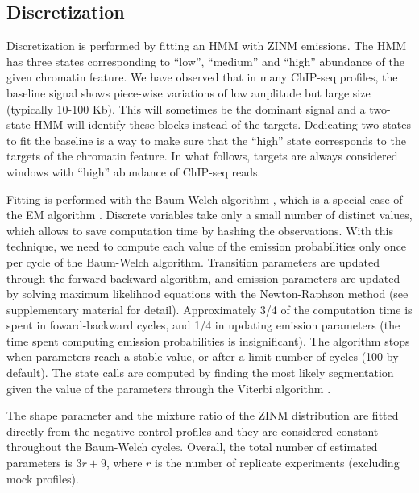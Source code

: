 \documentclass{bioinfo}
\begin{document}
\begin{methods}
\subsection{Discretization}
Discretization is performed by fitting an HMM
with ZINM emissions. The HMM has three
states corresponding to ``low'', ``medium'' and ``high'' abundance of
the given chromatin feature. We have observed that in many ChIP-seq
profiles, the baseline signal shows piece-wise variations of low amplitude
but large size (typically 10-100 Kb). This will sometimes be the dominant
signal and a two-state HMM will identify these blocks instead of the
targets. Dedicating two states to fit the baseline is a way to make sure
that the ``high'' state corresponds to the targets of the chromatin
feature. In what follows, targets are always considered windows
with ``high'' abundance of ChIP-seq reads.

Fitting is performed with the Baum-Welch algorithm \citep{baum1966},
which is a special case of the EM algorithm
\citep{Dempster77maximumlikelihood}.
Discrete variables take only a small number of distinct values, which
allows to save computation time by hashing the observations. With this
technique, we need to compute each value of the emission probabilities
only once per cycle of the Baum-Welch algorithm. Transition parameters
are updated through the forward-backward algorithm, and emission
parameters are updated by solving maximum likelihood equations
with the Newton-Raphson method (see supplementary material for detail).
Approximately 3/4 of the computation time is spent in foward-backward
cycles, and 1/4 in updating emission parameters (the time spent computing
emission probabilities is insignificant). The algorithm stops when
parameters reach a stable value, or after a limit number of cycles (100
by default). The state calls are computed by finding the most likely
segmentation given the value of the parameters through the Viterbi
algorithm \citep{1054010}.

The shape parameter and the mixture ratio of the ZINM distribution
are fitted directly from the negative control profiles and they are
considered constant throughout the Baum-Welch cycles. Overall, the
total number of estimated parameters is $3r+9$, where $r$ is the
number of replicate experiments (excluding mock profiles).


\end{methods}
\end{document}
